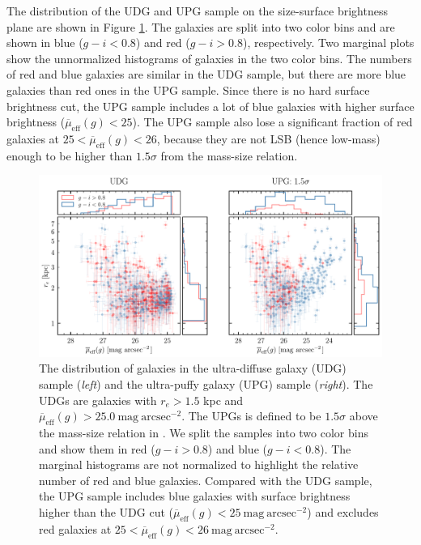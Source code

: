 \documentclass[twocolumn,astrosymb,twocolappendix]{aastex631}
\newcommand{\sbunit}{\mathrm{mag\ arcsec}^{-2}}
\newcommand{\sbeff}{\overline{\mu}_{\mathrm{eff}}(g)}
\begin{document}
\begin{CJK*}{UTF8}{gbsn}
The distribution of the UDG and UPG sample on the size-surface brightness plane are shown in Figure \ref{fig:udg_upg_re_mu}. The galaxies are split into two color bins and are shown in blue ($g-i < 0.8$) and red ($g-i > 0.8$), respectively. Two marginal plots show the unnormalized histograms of galaxies in the two color bins. The numbers of red and blue galaxies are similar in the UDG sample, but there are more blue galaxies than red ones in the UPG sample. Since there is no hard surface brightness cut, the UPG sample includes a lot of blue galaxies with higher surface brightness ($\sbeff < 25$). The UPG sample also lose a significant fraction of red galaxies at $25 < \sbeff < 26$, because they are not LSB (hence low-mass) enough to be higher than $1.5\sigma$ from the mass-size relation.

\begin{figure}
	\vbox{ 
		\centering
		\includegraphics[width=1\linewidth]{udg_upg_sample.pdf}
	}
    \caption{The distribution of galaxies in the ultra-diffuse galaxy (UDG) sample (\textit{left}) and the ultra-puffy galaxy (UPG) sample (\textit{right}). The UDGs are galaxies with $r_e>1.5$ kpc and $\sbeff > 25.0\ \sbunit$. The UPGs is defined to be $1.5\sigma$ above the mass-size relation in \citet{ELVES-I}. We split the samples into two color bins and show them in red ($g-i>0.8$) and blue ($g-i<0.8$). The marginal histograms are not normalized to highlight the relative number of red and blue galaxies. Compared with the UDG sample, the UPG sample includes blue galaxies with surface brightness higher than the UDG cut ($\sbeff < 25\ \sbunit$) and excludes red galaxies at $25 < \sbeff < 26\ \sbunit$.
    }
    \label{fig:udg_upg_re_mu}
\end{figure}


\end{CJK*}
\end{document}
